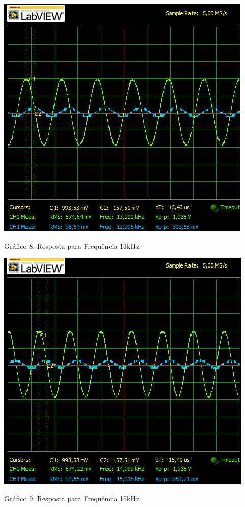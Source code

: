 \newpage
\begin{table}[h]
\centering
\includegraphics[scale=0.7]{graficos/RGADICOA13}
\end{table}
\begin{center}
Gráfico 8: Resposta para Frequência 13kHz
\end{center}


\begin{table}[h]
\centering
\includegraphics[scale=0.7]{graficos/RGADICOA15}
\end{table}
\begin{center}
Gráfico 9: Resposta para Frequência 15kHz
\end{center}

